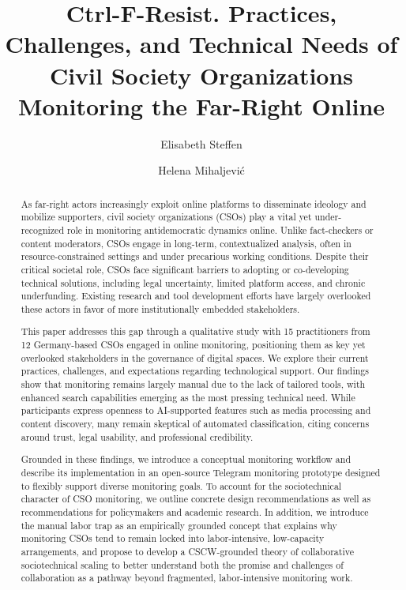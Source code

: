 \documentclass[acmsmall]{acmart}
\begin{document}
\title[Ctrl-F-Resist]{Ctrl-F-Resist. Practices, Challenges, and Technical Needs of Civil Society Organizations Monitoring the Far-Right Online}


\author{Elisabeth Steffen}

\author{Helena Mihaljevi\'c}


\begin{abstract}

As far-right actors increasingly exploit online platforms to disseminate ideology and mobilize supporters, civil society organizations (CSOs) play a vital yet under-recognized role in monitoring antidemocratic dynamics online. Unlike fact-checkers or content moderators, CSOs engage in long-term, contextualized analysis, often in resource-constrained settings and under precarious working conditions. Despite their critical societal role, CSOs face significant barriers to adopting or co-developing technical solutions, including legal uncertainty, limited platform access, and chronic underfunding. Existing research and tool development efforts have largely overlooked these actors in favor of more institutionally embedded stakeholders.

This paper addresses this gap through a qualitative study with 15 practitioners from 12 Germany-based CSOs engaged in online monitoring, positioning them as key yet overlooked stakeholders in the governance of digital spaces. We explore their current practices, challenges, and expectations regarding technological support. Our findings show that monitoring remains largely manual due to the lack of tailored tools, with enhanced search capabilities emerging as the most pressing technical need. While participants express openness to AI-supported features such as media processing and content discovery, many remain skeptical of automated classification, citing concerns around trust, legal usability, and professional credibility.

Grounded in these findings, we introduce a conceptual monitoring workflow and describe its implementation in an open-source Telegram monitoring prototype designed to flexibly support diverse monitoring goals. To account for the sociotechnical character of CSO monitoring, we outline concrete design recommendations as well as recommendations for policymakers and academic research. In addition, we introduce the manual labor trap as an empirically grounded concept that explains why monitoring CSOs tend to remain locked into labor-intensive, low-capacity arrangements, and propose to develop a CSCW-grounded theory of collaborative sociotechnical scaling to better understand both the promise and challenges of collaboration as a pathway beyond fragmented, labor-intensive monitoring work.


\end{abstract}
\end{document}
